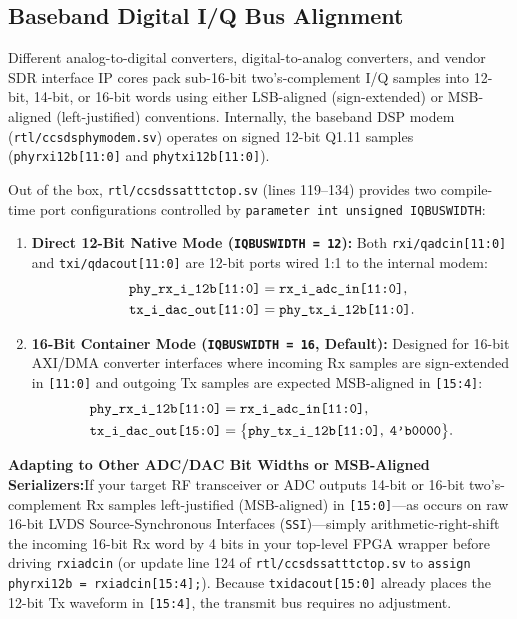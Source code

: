 \documentclass[10pt,a4paper]{article}
\renewcommand{\_}{\origunderscore\penalty0\hskip0pt\relax}
\newcommand{\archnote}[2]{%
  \par\vspace{4pt}\noindent\colorbox{boxbg}{%
    \parbox{\dimexpr\textwidth-2\fboxsep\relax}{%
      \vspace{4pt}\raggedright\textbf{\sffamily\color{navy}#1:}\hspace{0.4em}#2\vspace{4pt}%
    }%
  }\par\vspace{4pt}%
}
\numberwithin{table}{section}
\numberwithin{figure}{section}
\numberwithin{equation}{section}
\begin{document}
\subsection{Baseband Digital I/Q Bus Alignment}
Different analog-to-digital converters, digital-to-analog converters, and vendor SDR interface IP cores pack sub-16-bit two's-complement I/Q samples into 12-bit, 14-bit, or 16-bit words using either LSB-aligned (sign-extended) or MSB-aligned (left-justified) conventions. Internally, the baseband DSP modem (\texttt{rtl/ccsds\_phy\_modem.sv}) operates on signed 12-bit Q1.11 samples (\texttt{phy\_rx\_i\_12b[11:0]} and \texttt{phy\_tx\_i\_12b[11:0]}).

Out of the box, \texttt{rtl/ccsds\_sat\_ttc\_top.sv} (lines 119--134) provides two compile-time port configurations controlled by \texttt{parameter int unsigned IQ\_BUS\_WIDTH}:
\begin{enumerate}\setlength{\itemsep}{2.5pt}
    \item \textbf{Direct 12-Bit Native Mode (\texttt{IQ\_BUS\_WIDTH = 12}):} Both \texttt{rx\_i/q\_adc\_in[11:0]} and \texttt{tx\_i/q\_dac\_out[11:0]} are 12-bit ports wired 1:1 to the internal modem:
    \begin{equation}
    \begin{aligned}
      \texttt{phy\_rx\_i\_12b[11:0]} &= \texttt{rx\_i\_adc\_in[11:0]}, \\
      \texttt{tx\_i\_dac\_out[11:0]} &= \texttt{phy\_tx\_i\_12b[11:0]}.
    \end{aligned}
    \end{equation}
    \item \textbf{16-Bit Container Mode (\texttt{IQ\_BUS\_WIDTH = 16}, Default):} Designed for 16-bit AXI/DMA converter interfaces where incoming Rx samples are sign-extended in \texttt{[11:0]} and outgoing Tx samples are expected MSB-aligned in \texttt{[15:4]}:
    \begin{equation}
    \begin{aligned}
      \texttt{phy\_rx\_i\_12b[11:0]} &= \texttt{rx\_i\_adc\_in[11:0]}, \\
      \texttt{tx\_i\_dac\_out[15:0]} &= \big\{\texttt{phy\_tx\_i\_12b[11:0]},\; \texttt{4'b0000}\big\}.
    \end{aligned}
    \end{equation}
\end{enumerate}

\archnote{Adapting to Other ADC/DAC Bit Widths or MSB-Aligned Serializers}{If your target RF transceiver or ADC outputs 14-bit or 16-bit two's-complement Rx samples left-justified (MSB-aligned) in \texttt{[15:0]}—as occurs on raw 16-bit LVDS Source-Synchronous Interfaces (\texttt{SSI})—simply arithmetic-right-shift the incoming 16-bit Rx word by 4 bits in your top-level FPGA wrapper before driving \texttt{rx\_i\_adc\_in} (or update line 124 of \texttt{rtl/ccsds\_sat\_ttc\_top.sv} to \texttt{assign phy\_rx\_i\_12b = rx\_i\_adc\_in[15:4];}). Because \texttt{tx\_i\_dac\_out[15:0]} already places the 12-bit Tx waveform in \texttt{[15:4]}, the transmit bus requires no adjustment.}
\end{document}
